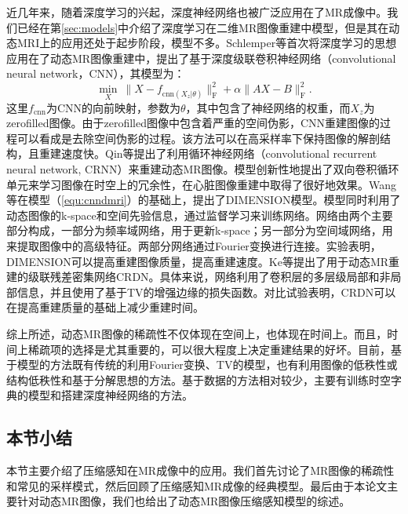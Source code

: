 近几年来，随着深度学习的兴起，深度神经网络也被广泛应用在了MR成像中。我们已经在第\ref{sec:models}中介绍了深度学习在二维MR图像重建中模型，但是其在动态MRI上的应用还处于起步阶段，模型不多。Schlemper等\cite{schlemper2017deep}首次将深度学习的思想应用在了动态MR图像重建中，提出了基于深度级联卷积神经网络（convolutional neural network，CNN），其模型为：
\begin{equation}
	\min_X \ \|X-f_{\mathrm{cnn}(X_z|\theta)}\|_\mathrm{F}^2+\alpha\|AX-B\|^2_\mathrm{F}.
	\label{equ:cnndmri}
\end{equation}
这里$f_{\mathrm{cnn}}$为CNN的向前映射，参数为$\theta$，其中包含了神经网络的权重，而$X_z$为zerofilled图像。由于zerofilled图像中包含着严重的空间伪影，CNN重建图像的过程可以看成是去除空间伪影的过程。该方法可以在高采样率下保持图像的解剖结构，且重建速度快。Qin等\cite{qin2018convolutional}提出了利用循环神经网络（convolutional recurrent neural network, CRNN）来重建动态MR图像。模型创新性地提出了双向卷积循环单元来学习图像在时空上的冗余性，在心脏图像重建中取得了很好地效果。Wang\cite{wang2018dimension}等在模型（\ref{equ:cnndmri}）的基础上，提出了DIMENSION模型。模型同时利用了动态图像的k-space和空间先验信息，通过监督学习来训练网络。网络由两个主要部分构成，一部分为频率域网络，用于更新k-space；另一部分为空间域网络，用来提取图像中的高级特征。两部分网络通过Fourier变换进行连接。实验表明，DIMENSION可以提高重建图像质量，提高重建速度。Ke等\cite{ke2019crdn}提出了用于动态MR重建的级联残差密集网络CRDN。具体来说，网络利用了卷积层的多层级局部和非局部信息，并且使用了基于TV的增强边缘的损失函数。对比试验表明，CRDN可以在提高重建质量的基础上减少重建时间。

综上所述，动态MR图像的稀疏性不仅体现在空间上，也体现在时间上。而且，时间上稀疏项的选择是尤其重要的，可以很大程度上决定重建结果的好坏。目前，基于模型的方法既有传统的利用Fourier变换、TV的模型，也有利用图像的低秩性或结构低秩性和基于分解思想的方法。基于数据的方法相对较少，主要有训练时空字典的模型和搭建深度神经网络的方法。

\subsection{本节小结}
本节主要介绍了压缩感知在MR成像中的应用。我们首先讨论了MR图像的稀疏性和常见的采样模式，然后回顾了压缩感知MR成像的经典模型。最后由于本论文主要针对动态MR图像，我们也给出了动态MR图像压缩感知模型的综述。

